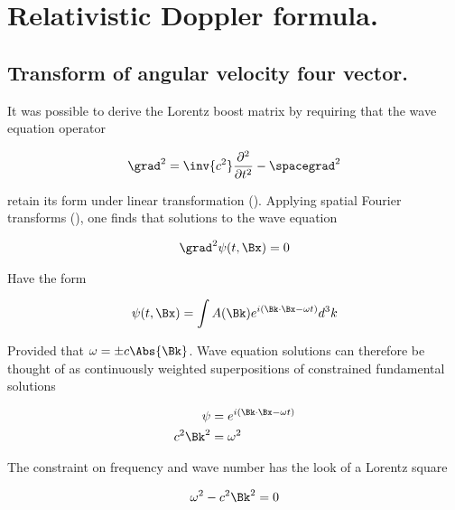 

\chapter{Relativistic Doppler formula.}
\label{chap:frequencyTx}
\date{June 27, 2009}

\beginArtWithToc

\section{Transform of angular velocity four vector.}

It was possible to derive the Lorentz boost matrix by requiring that the wave equation operator

\begin{align}
\grad^2 = \inv{c^2}\frac{\partial^2}{\partial t^2} - \spacegrad^2
\end{align}

retain its form under linear transformation (\cite{PJLorentzWave}).  Applying spatial Fourier transforms (\cite{PJwaveFourier}), one finds that solutions to the wave equation 

\begin{align}
\grad^2 \psi(t,\Bx) = 0
\end{align}

Have the form

\begin{align}
\psi(t, \Bx) = \int A(\Bk) e^{i(\Bk \cdot \Bx - \omega t)} d^3 k
\end{align}

Provided that $\omega = \pm c \Abs{\Bk}$.  Wave equation solutions can therefore be thought of as continuously weighted superpositions of constrained fundamental solutions

\begin{align}
\psi &= e^{i(\Bk \cdot \Bx - \omega t)} \\
c^2 \Bk^2 &= \omega^2
\end{align}

The constraint on frequency and wave number has the look of a Lorentz square

\begin{align}
\omega^2 - c^2 \Bk^2 = 0
\end{align}

